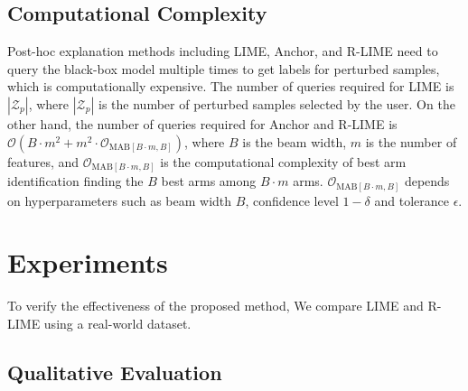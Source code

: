 \documentclass[11pt]{article}
\begin{document}

\ifnum{}
  \subsection{Computational Complexity}
  Post-hoc explanation methods including LIME, Anchor, and R-LIME
  need to query the black-box model multiple times
  to get labels for perturbed samples, which is computationally expensive.
  The number of queries required for LIME is $|\mathcal{Z}_p|$,
  where $|\mathcal{Z}_p|$ is the number of perturbed samples selected by the user.
  On the other hand,
  the number of queries required for Anchor and R-LIME is
  $\mathcal{O}(B\cdot m^2+m^2\cdot\mathcal{O}_{\mathrm{MAB}[B\cdot m,B]})$,
  where $B$ is the beam width, $m$ is the number of features, and
  $\mathcal{O}_{\mathrm{MAB}[B\cdot m,B]}$ is the computational complexity of
  best arm identification finding the $B$ best arms among $B\cdot m$ arms.
  $\mathcal{O}_{\mathrm{MAB}[B\cdot m,B]}$ depends on hyperparameters
  such as beam width $B$, confidence level $1-\delta$ and tolerance $\epsilon$.
\fi

\section{Experiments}
To verify the effectiveness of the proposed method,
We compare LIME and R-LIME using a real-world dataset.

\subsection{Qualitative Evaluation}
\end{document}
